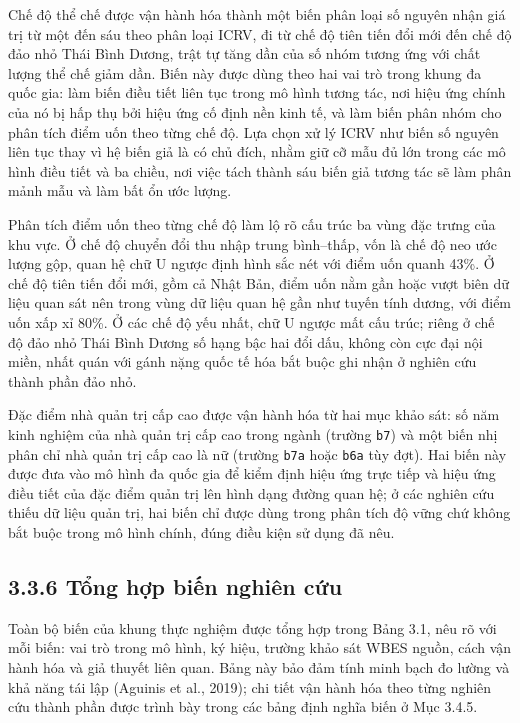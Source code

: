 \documentclass[
  a4paper,
  13pt]{extreport}
\begin{document}
Chế độ thể chế được vận hành hóa thành một biến phân loại số nguyên nhận
giá trị từ một đến sáu theo phân loại ICRV, đi từ chế độ tiên tiến đổi
mới đến chế độ đảo nhỏ Thái Bình Dương, trật tự tăng dần của số nhóm
tương ứng với chất lượng thể chế giảm dần. Biến này được dùng theo hai
vai trò trong khung đa quốc gia: làm biến điều tiết liên tục trong mô
hình tương tác, nơi hiệu ứng chính của nó bị hấp thụ bởi hiệu ứng cố
định nền kinh tế, và làm biến phân nhóm cho phân tích điểm uốn theo từng
chế độ. Lựa chọn xử lý ICRV như biến số nguyên liên tục thay vì hệ biến
giả là có chủ đích, nhằm giữ cỡ mẫu đủ lớn trong các mô hình điều tiết
và ba chiều, nơi việc tách thành sáu biến giả tương tác sẽ làm phân mảnh
mẫu và làm bất ổn ước lượng.

Phân tích điểm uốn theo từng chế độ làm lộ rõ cấu trúc ba vùng đặc trưng
của khu vực. Ở chế độ chuyển đổi thu nhập trung bình--thấp, vốn là chế
độ neo ước lượng gộp, quan hệ chữ U ngược định hình sắc nét với điểm uốn
quanh 43\%. Ở chế độ tiên tiến đổi mới, gồm cả Nhật Bản, điểm uốn nằm
gần hoặc vượt biên dữ liệu quan sát nên trong vùng dữ liệu quan hệ gần
như tuyến tính dương, với điểm uốn xấp xỉ 80\%. Ở các chế độ yếu nhất,
chữ U ngược mất cấu trúc; riêng ở chế độ đảo nhỏ Thái Bình Dương số hạng
bậc hai đổi dấu, không còn cực đại nội miền, nhất quán với gánh nặng
quốc tế hóa bắt buộc ghi nhận ở nghiên cứu thành phần đảo nhỏ.

Đặc điểm nhà quản trị cấp cao được vận hành hóa từ hai mục khảo sát: số
năm kinh nghiệm của nhà quản trị cấp cao trong ngành (trường
\texttt{b7}) và một biến nhị phân chỉ nhà quản trị cấp cao là nữ (trường
\texttt{b7a} hoặc \texttt{b6a} tùy đợt). Hai biến này được đưa vào mô
hình đa quốc gia để kiểm định hiệu ứng trực tiếp và hiệu ứng điều tiết
của đặc điểm quản trị lên hình dạng đường quan hệ; ở các nghiên cứu
thiếu dữ liệu quản trị, hai biến chỉ được dùng trong phân tích độ vững
chứ không bắt buộc trong mô hình chính, đúng điều kiện sử dụng đã nêu.

\hypertarget{tux1ed5ng-hux1ee3p-biux1ebfn-nghiuxean-cux1ee9u}{%
\subsection{3.3.6 Tổng hợp biến nghiên
cứu}\label{tux1ed5ng-hux1ee3p-biux1ebfn-nghiuxean-cux1ee9u}}

Toàn bộ biến của khung thực nghiệm được tổng hợp trong Bảng 3.1, nêu rõ
với mỗi biến: vai trò trong mô hình, ký hiệu, trường khảo sát WBES
nguồn, cách vận hành hóa và giả thuyết liên quan. Bảng này bảo đảm tính
minh bạch đo lường và khả năng tái lập (Aguinis et al., 2019); chi tiết
vận hành hóa theo từng nghiên cứu thành phần được trình bày trong các
bảng định nghĩa biến ở Mục 3.4.5.
\end{document}
